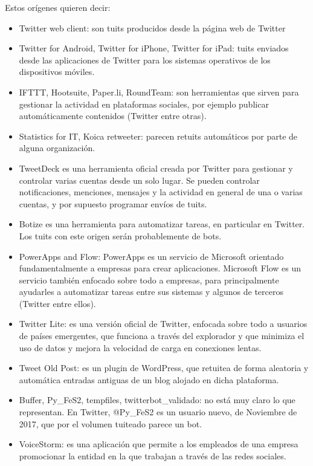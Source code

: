 Estos orígenes quieren decir:
\begin{itemize}
\item Twitter web client: son tuits producidos desde la página web de Twitter
\item Twitter for Android, Twitter for iPhone, Twitter for iPad: tuits enviados desde las aplicaciones
de Twitter para los sistemas operativos de los dispositivos móviles.
\item IFTTT, Hootsuite, Paper.li, RoundTeam: son herramientas que sirven para gestionar 
la actividad en plataformas
sociales, por ejemplo publicar automáticamente contenidos (Twitter entre otras).
\item Statistics for IT, Koica retweeter: parecen retuits automáticos por parte
de alguna organización.
\item TweetDeck es una herramienta oficial creada por Twitter para gestionar y controlar 
varias cuentas desde un solo lugar. Se pueden controlar notificaciones, menciones, 
mensajes y la actividad en general de una o varias cuentas, y por supuesto programar envíos
de tuits.
\item Botize es una herramienta para automatizar tareas, en particular en Twitter. 
Los tuits con este origen serán probablemente de bots.
\item PowerApps and Flow: PowerApps es un servicio de Microsoft 
orientado fundamentalmente a empresas para crear aplicaciones. Microsoft Flow 
es un servicio también enfocado sobre todo a empresas, para principalmente ayudarles a 
automatizar tareas entre sus sistemas y algunos de terceros (Twitter entre ellos).
\item Twitter Lite: es una versión oficial de Twitter, enfocada sobre todo a usuarios 
de países emergentes, que funciona a través del explorador y que minimiza el uso de datos 
y mejora la velocidad de carga en conexiones lentas.
\item Tweet Old Post: es un plugin de WordPress, que retuitea de forma aleatoria y 
automática entradas antiguas de un blog alojado en dicha plataforma.
\item Buffer, Py\_FeS2, tempfiles, twitterbot\_validado: no está muy claro lo que representan. 
En Twitter, @Py\_FeS2 es un usuario nuevo, de Noviembre de 2017, que por el volumen 
tuiteado parece un bot.
\item VoiceStorm: es una aplicación que permite a los empleados de una empresa
promocionar la entidad en la que trabajan a través de las redes sociales.
\end{itemize}

